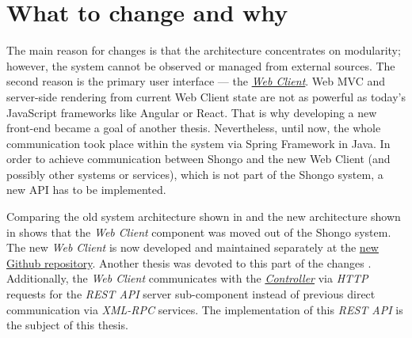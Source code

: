 \section{What to change and why}

The main reason for changes is that the architecture concentrates on modularity; however, the system cannot be observed or managed from external sources.
The second reason is the primary user interface --- the \hyperref[webclient]{\emph{Web Client}}. Web MVC and server-side rendering from current Web Client state are not as powerful as today's JavaScript frameworks like Angular or React.
That is why developing a new front-end became a goal of another thesis. \cite{drobnakm}
Nevertheless, until now, the whole communication took place within the system via Spring Framework in Java. In order to achieve communication between Shongo and the new Web Client (and possibly other systems or services), which is not part of the Shongo system, a new API has to be implemented.


Comparing the old system architecture shown in  and the new architecture shown in  shows that the \emph{Web Client} component was moved out of the Shongo system. The new \emph{Web Client} is now developed and maintained separately at the \href{https://github.com/shongo/shongo-frontend}{new Github repository}. Another thesis was devoted to this part of the changes \cite{drobnakm}.
Additionally, the \emph{Web Client} communicates with the \hyperref[controller]{\emph{Controller}} via \emph{HTTP} requests for the \emph{REST API} server sub-component instead of previous direct communication via \emph{XML-RPC} services. The implementation of this \emph{REST API} is the subject of this thesis.
